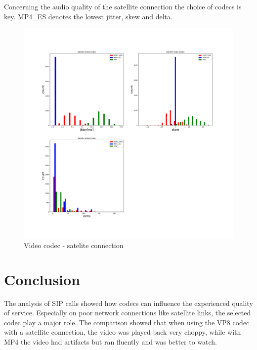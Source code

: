 \documentclass[parskip=full]{scrartcl}
\begin{document}
Concerning the audio quality of the satellite connection the choice of codecs is key. MP4\_ES denotes the lowest jitter, skew and delta.

\begin{figure}[!ht]
	\centering %
	\includegraphics[width=\textwidth]{images/satelite-video-histogram.pdf} %
	\caption{Video codec - satelite connection} 
	\label{fig:Video} %
\end{figure} 

\newpage
\section{Conclusion}

The analysis of SIP calls showed how codecs can influence the experienced quality of service. 
Especially on poor network connections like satellite links, the selected codec play a major role.
The comparison showed that when using the VP8 codec with a satellite connection, the video was played back very choppy, while with MP4 the video had artifacts but ran fluently and was better to watch.


\printbibliography
\end{document}
